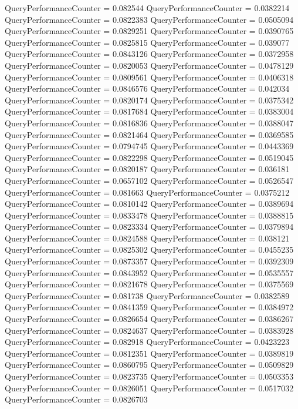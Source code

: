 \documentclass[9pt]{article}
\theoremstyle{plain}
\theoremstyle{definition}
\theoremstyle{remark}
\numberwithin{equation}{section}
\begin{document}
QueryPerformanceCounter  =  0.082544
QueryPerformanceCounter  =  0.0382214
QueryPerformanceCounter  =  0.0822383
QueryPerformanceCounter  =  0.0505094
QueryPerformanceCounter  =  0.0829251
QueryPerformanceCounter  =  0.0390765
QueryPerformanceCounter  =  0.0825815
QueryPerformanceCounter  =  0.039077
QueryPerformanceCounter  =  0.0843126
QueryPerformanceCounter  =  0.0372958
QueryPerformanceCounter  =  0.0820053
QueryPerformanceCounter  =  0.0478129
QueryPerformanceCounter  =  0.0809561
QueryPerformanceCounter  =  0.0406318
QueryPerformanceCounter  =  0.0846576
QueryPerformanceCounter  =  0.042034
QueryPerformanceCounter  =  0.0820174
QueryPerformanceCounter  =  0.0375342
QueryPerformanceCounter  =  0.0817684
QueryPerformanceCounter  =  0.0383004
QueryPerformanceCounter  =  0.0816836
QueryPerformanceCounter  =  0.0388047
QueryPerformanceCounter  =  0.0821464
QueryPerformanceCounter  =  0.0369585
QueryPerformanceCounter  =  0.0794745
QueryPerformanceCounter  =  0.0443369
QueryPerformanceCounter  =  0.0822298
QueryPerformanceCounter  =  0.0519045
QueryPerformanceCounter  =  0.0820187
QueryPerformanceCounter  =  0.036181
QueryPerformanceCounter  =  0.0657102
QueryPerformanceCounter  =  0.0526547
QueryPerformanceCounter  =  0.081663
QueryPerformanceCounter  =  0.0375212
QueryPerformanceCounter  =  0.0810142
QueryPerformanceCounter  =  0.0389694
QueryPerformanceCounter  =  0.0833478
QueryPerformanceCounter  =  0.0388815
QueryPerformanceCounter  =  0.0823334
QueryPerformanceCounter  =  0.0379894
QueryPerformanceCounter  =  0.0824588
QueryPerformanceCounter  =  0.038121
QueryPerformanceCounter  =  0.0825302
QueryPerformanceCounter  =  0.0455235
QueryPerformanceCounter  =  0.0873357
QueryPerformanceCounter  =  0.0392309
QueryPerformanceCounter  =  0.0843952
QueryPerformanceCounter  =  0.0535557
QueryPerformanceCounter  =  0.0821678
QueryPerformanceCounter  =  0.0375569
QueryPerformanceCounter  =  0.081738
QueryPerformanceCounter  =  0.0382589
QueryPerformanceCounter  =  0.0841359
QueryPerformanceCounter  =  0.0384972
QueryPerformanceCounter  =  0.0826654
QueryPerformanceCounter  =  0.0386267
QueryPerformanceCounter  =  0.0824637
QueryPerformanceCounter  =  0.0383928
QueryPerformanceCounter  =  0.082918
QueryPerformanceCounter  =  0.0423223
QueryPerformanceCounter  =  0.0812351
QueryPerformanceCounter  =  0.0389819
QueryPerformanceCounter  =  0.0860795
QueryPerformanceCounter  =  0.0509829
QueryPerformanceCounter  =  0.0823735
QueryPerformanceCounter  =  0.0503353
QueryPerformanceCounter  =  0.0826051
QueryPerformanceCounter  =  0.0517032
QueryPerformanceCounter  =  0.0826703
\end{document}
